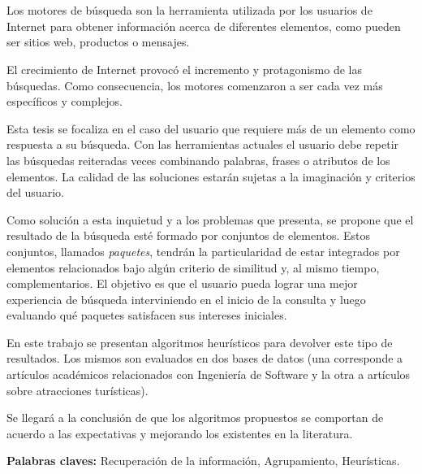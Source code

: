 \chapter*{\runtitulo}

\noindent 

Los motores de búsqueda son la herramienta utilizada por los usuarios de Internet para obtener información acerca de diferentes elementos, como pueden ser sitios web, productos o mensajes.

El crecimiento de Internet provocó el incremento y protagonismo de las búsquedas. Como consecuencia, los motores comenzaron a ser cada vez más específicos y complejos. 

Esta tesis se focaliza en el caso del usuario que requiere más de un elemento como respuesta a su búsqueda. Con las herramientas actuales el usuario debe repetir las búsquedas reiteradas veces combinando palabras, frases o atributos de los elementos. La calidad de las soluciones estarán sujetas a la imaginación y criterios del usuario.

Como solución a esta inquietud y a los problemas que presenta, se propone que el resultado de la búsqueda esté formado por conjuntos de elementos. Estos conjuntos, llamados {\em paquetes}, tendrán la particularidad de estar integrados por elementos relacionados bajo algún criterio de similitud y, al mismo tiempo, complementarios. El objetivo es que el usuario pueda lograr una mejor experiencia de búsqueda interviniendo en el inicio de la consulta y luego evaluando qué paquetes satisfacen sus intereses iniciales.

En este trabajo se presentan algoritmos heurísticos para devolver este tipo de resultados. Los mismos son evaluados en dos bases de datos (una corresponde a artículos académicos relacionados con Ingeniería de Software y la otra a artículos sobre atracciones turísticas).

Se llegará a la conclusión de que los algoritmos propuestos se comportan de acuerdo a las expectativas y mejorando los existentes en la literatura.


\bigskip



\noindent\textbf{Palabras claves:} Recuperación de la información, Agrupamiento, Heurísticas.
